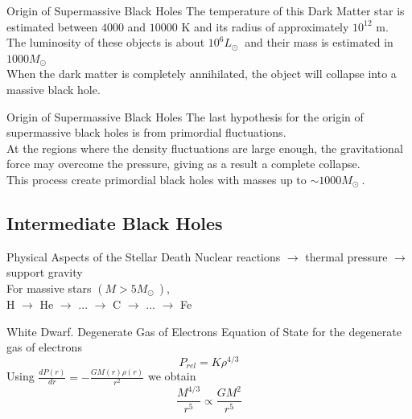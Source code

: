 \documentclass{beamer}
\begin{document}
\begin{frame}{Origin of Supermassive Black Holes}
	\onslide<1-> The temperature of this Dark Matter star is estimated between $4000$ and $10000$ \si{K} and its radius of approximately $10^{12}$ \si{m}.\\
	\pause
	\bigskip
	\onslide<2-> The luminosity of these objects is about $10^6 L_\odot\ $ and their mass is estimated in $1000 M_\odot\ $\\ 
	\pause
	\bigskip
	\onslide<3-> When the dark matter is completely annihilated, the object will collapse into a massive black hole.
\end{frame}

\begin{frame}{Origin of Supermassive Black Holes}
	\onslide<1-> The last hypothesis for the origin of supermassive black holes is from primordial fluctuations.\\
	\pause
	\bigskip
	\onslide<2-> At the regions where the density fluctuations are large enough, the gravitational force may overcome the pressure, giving as a result a complete collapse.\\ 
	\pause
	\bigskip
	\onslide<3-> This process create primordial black holes with masses up to $\sim 1000 M_\odot\ $. \\
\end{frame}


\subsection{Intermediate Black Holes}
\begin{frame}{Physical Aspects of the Stellar Death}
	\onslide<1-> 
    Nuclear reactions $\rightarrow$ thermal pressure $\rightarrow$ support gravity \\
    \bigskip
    For massive stars $(M > 5M_\odot\ )$,\\
    H $\rightarrow$ He $\rightarrow$ ... $\rightarrow$ C $\rightarrow$ ... $\rightarrow$ Fe
\end{frame}

\begin{frame}{White Dwarf. Degenerate Gas of Electrons}
	\onslide<1-> Equation of State for the degenerate gas of electrons
    $$P_{rel} = K \rho^{4/3}$$
     Using $\frac{dP(r)}{dr} = -\frac{GM(r)\rho(r)}{r^2}$ we obtain 
    $$\frac{M^{4/3}}{r^5} \propto \frac{GM^2}{r^5} $$
\end{frame}
\end{document}
